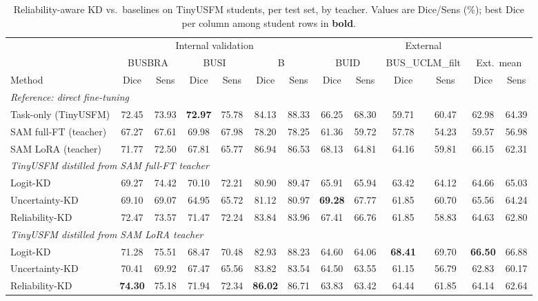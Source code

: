 \begin{table}[t]
\centering
\caption{Reliability-aware KD vs.\ baselines on TinyUSFM students, per test set, by teacher. Values are Dice/Sens (\%); best Dice per column among student rows in \textbf{bold}.}
\label{tab:kd_reliability_teacher}
\setlength{\tabcolsep}{3pt}
\begin{tabular}{l*{12}{c}}
\toprule
 & \multicolumn{6}{c}{Internal validation} & \multicolumn{6}{c}{External} \\
\cmidrule(lr){2-7} \cmidrule(lr){8-13}
 & \multicolumn{2}{c}{BUSBRA} & \multicolumn{2}{c}{BUSI} & \multicolumn{2}{c}{B} & \multicolumn{2}{c}{BUID} & \multicolumn{2}{c}{BUS\_UCLM\_filt} & \multicolumn{2}{c}{Ext.\ mean} \\
\cmidrule(lr){2-3} \cmidrule(lr){4-5} \cmidrule(lr){6-7} \cmidrule(lr){8-9} \cmidrule(lr){10-11} \cmidrule(lr){12-13}
Method & Dice & Sens & Dice & Sens & Dice & Sens & Dice & Sens & Dice & Sens & Dice & Sens \\
\midrule
\multicolumn{13}{l}{\textit{Reference: direct fine-tuning}}\\
Task-only (TinyUSFM) & 72.45 & 73.93 & \textbf{72.97} & 75.78 & 84.13 & 88.33 & 66.25 & 68.30 & 59.71 & 60.47 & 62.98 & 64.39 \\
SAM full-FT (teacher) & 67.27 & 67.61 & 69.98 & 67.98 & 78.20 & 78.25 & 61.36 & 59.72 & 57.78 & 54.23 & 59.57 & 56.98 \\
SAM LoRA (teacher) & 71.77 & 72.50 & 67.81 & 65.77 & 86.94 & 86.53 & 68.13 & 64.81 & 64.16 & 59.81 & 66.15 & 62.31 \\
\midrule
\multicolumn{13}{l}{\textit{TinyUSFM distilled from SAM full-FT teacher}}\\
Logit-KD & 69.27 & 74.42 & 70.10 & 72.21 & 80.90 & 89.47 & 65.91 & 65.94 & 63.42 & 64.12 & 64.66 & 65.03 \\
Uncertainty-KD & 69.10 & 69.07 & 64.95 & 65.72 & 81.12 & 80.97 & \textbf{69.28} & 67.77 & 61.85 & 60.70 & 65.56 & 64.24 \\
Reliability-KD & 72.47 & 73.57 & 71.47 & 72.24 & 83.84 & 83.96 & 67.41 & 66.76 & 61.85 & 58.83 & 64.63 & 62.80 \\
\midrule
\multicolumn{13}{l}{\textit{TinyUSFM distilled from SAM LoRA teacher}}\\
Logit-KD & 71.28 & 75.51 & 68.47 & 70.48 & 82.93 & 88.23 & 64.60 & 64.06 & \textbf{68.41} & 69.70 & \textbf{66.50} & 66.88 \\
Uncertainty-KD & 70.41 & 69.92 & 67.47 & 65.56 & 83.82 & 83.54 & 64.50 & 63.55 & 61.15 & 56.79 & 62.83 & 60.17 \\
Reliability-KD & \textbf{74.30} & 75.18 & 71.94 & 72.34 & \textbf{86.02} & 86.71 & 63.83 & 63.42 & 64.44 & 61.85 & 64.14 & 62.64 \\
\bottomrule
\end{tabular}
\end{table}
